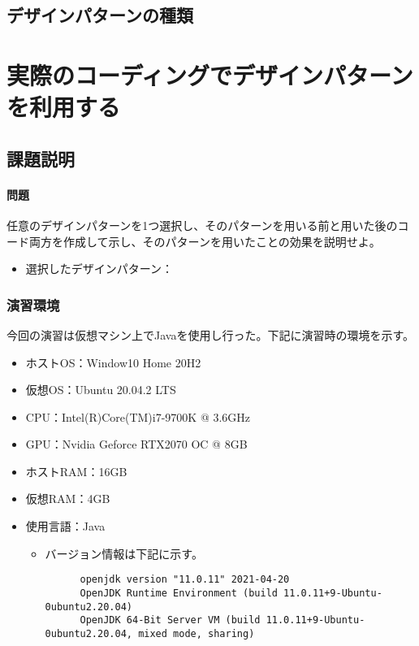 \documentclass[dvipdfmx]{jsarticle}
\begin{document}
\subsection{デザインパターンの種類}


\section{実際のコーディングでデザインパターンを利用する}
\subsection{課題説明}
\paragraph{問題} 任意のデザインパターンを1つ選択し、そのパターンを用いる前と用いた後のコード両方を作成して示し、そのパターンを用いたことの効果を説明せよ。
\begin{itemize}
  \item 選択したデザインパターン：
\end{itemize}

\subsubsection{演習環境}
今回の演習は仮想マシン上でJavaを使用し行った。下記に演習時の環境を示す。
\begin{itemize}
  \item ホストOS：Window10 Home 20H2
  \item 仮想OS：Ubuntu 20.04.2 LTS
  \item CPU：Intel(R)Core(TM)i7-9700K @ 3.6GHz
  \item GPU：Nvidia Geforce RTX2070 OC @ 8GB
  \item ホストRAM：16GB
  \item 仮想RAM：4GB
  \item 使用言語：Java
  \begin{itemize}
    \item バージョン情報は下記に示す。
    \begin{verbatim}
      openjdk version "11.0.11" 2021-04-20
      OpenJDK Runtime Environment (build 11.0.11+9-Ubuntu-0ubuntu2.20.04)
      OpenJDK 64-Bit Server VM (build 11.0.11+9-Ubuntu-0ubuntu2.20.04, mixed mode, sharing)
    \end{verbatim}
  \end{itemize}
\end{itemize}
\end{document}
